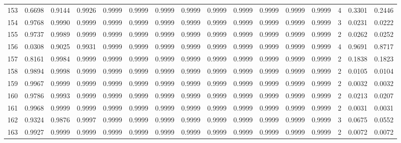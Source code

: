 \begin{tabular}{lrrrrrrrrrrrrrrr}
153 &      0.6698 &  0.9144 &  0.9926 &  0.9999 &  0.9999 &  0.9999 &  0.9999 &  0.9999 &  0.9999 &  0.9999 &   0.9999 &     0.9999 &      4 &                    0.3301 &                     0.2446 \\
154 &      0.9768 &  0.9990 &  0.9999 &  0.9999 &  0.9999 &  0.9999 &  0.9999 &  0.9999 &  0.9999 &  0.9999 &   0.9999 &     0.9999 &      3 &                    0.0231 &                     0.0222 \\
155 &      0.9737 &  0.9989 &  0.9999 &  0.9999 &  0.9999 &  0.9999 &  0.9999 &  0.9999 &  0.9999 &  0.9999 &   0.9999 &     0.9999 &      2 &                    0.0262 &                     0.0252 \\
156 &      0.0308 &  0.9025 &  0.9931 &  0.9999 &  0.9999 &  0.9999 &  0.9999 &  0.9999 &  0.9999 &  0.9999 &   0.9999 &     0.9999 &      4 &                    0.9691 &                     0.8717 \\
157 &      0.8161 &  0.9984 &  0.9999 &  0.9999 &  0.9999 &  0.9999 &  0.9999 &  0.9999 &  0.9999 &  0.9999 &   0.9999 &     0.9999 &      2 &                    0.1838 &                     0.1823 \\
158 &      0.9894 &  0.9998 &  0.9999 &  0.9999 &  0.9999 &  0.9999 &  0.9999 &  0.9999 &  0.9999 &  0.9999 &   0.9999 &     0.9999 &      2 &                    0.0105 &                     0.0104 \\
159 &      0.9967 &  0.9999 &  0.9999 &  0.9999 &  0.9999 &  0.9999 &  0.9999 &  0.9999 &  0.9999 &  0.9999 &   0.9999 &     0.9999 &      2 &                    0.0032 &                     0.0032 \\
160 &      0.9786 &  0.9993 &  0.9999 &  0.9999 &  0.9999 &  0.9999 &  0.9999 &  0.9999 &  0.9999 &  0.9999 &   0.9999 &     0.9999 &      2 &                    0.0213 &                     0.0207 \\
161 &      0.9968 &  0.9999 &  0.9999 &  0.9999 &  0.9999 &  0.9999 &  0.9999 &  0.9999 &  0.9999 &  0.9999 &   0.9999 &     0.9999 &      2 &                    0.0031 &                     0.0031 \\
162 &      0.9324 &  0.9876 &  0.9997 &  0.9999 &  0.9999 &  0.9999 &  0.9999 &  0.9999 &  0.9999 &  0.9999 &   0.9999 &     0.9999 &      3 &                    0.0675 &                     0.0552 \\
163 &      0.9927 &  0.9999 &  0.9999 &  0.9999 &  0.9999 &  0.9999 &  0.9999 &  0.9999 &  0.9999 &  0.9999 &   0.9999 &     0.9999 &      2 &                    0.0072 &                     0.0072 \\

\end{tabular}
